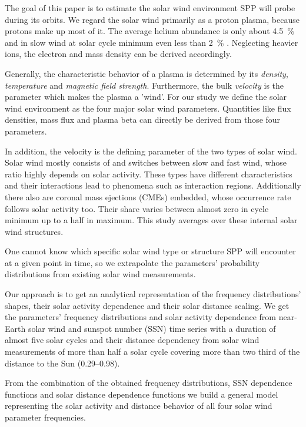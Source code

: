 The goal of this paper is to estimate the solar wind environment SPP will probe during its orbits. We regard the solar wind primarily as a proton plasma, because protons make up most of it. The average helium abundance is only about \SI{4.5}{\percent} and in slow wind at solar cycle minimum even less than \SI{2}{\percent} \citep{Feldman1978,Schwenn1983,Kasper2012}. Neglecting heavier ions, the electron and mass density can be derived accordingly.

Generally, the characteristic behavior of a plasma is determined by its \textit{density}, \textit{temperature} and \textit{magnetic field strength}. Furthermore, the bulk \textit{velocity} is the parameter which makes the plasma a 'wind'. For our study we define the solar wind environment as the four major solar wind parameters. Quantities like flux densities, mass flux and plasma beta can directly be derived from those four parameters.

In addition, the velocity is the defining parameter of the two types of solar wind. Solar wind mostly consists of and switches between slow and fast wind, whose ratio highly depends on solar activity. These types have different characteristics and their interactions lead to phenomena such as interaction regions. Additionally there also are coronal mass ejections (CMEs) embedded, whose occurrence rate follows solar activity too. Their share varies between almost zero in cycle minimum up to a half in maximum. This study averages over these internal solar wind structures.

One cannot know which specific solar wind type or structure SPP will encounter at a given point in time, so we extrapolate the parameters' probability distributions from existing solar wind measurements.

Our approach is to get an analytical representation of the frequency distributions' shapes, their solar activity dependence and their solar distance scaling. We get the parameters' frequency distributions and solar activity dependence from near-Earth solar wind and sunspot number (SSN) time series with a duration of almost five solar cycles and their distance dependency from solar wind measurements of more than half a solar cycle covering more than two third of the distance to the Sun (\SIrange{0.29}{0.98}{\au}).%

From the combination of the obtained frequency distributions, SSN dependence functions and solar distance dependence functions we build a general model representing the solar activity and distance behavior of all four solar wind parameter frequencies.

